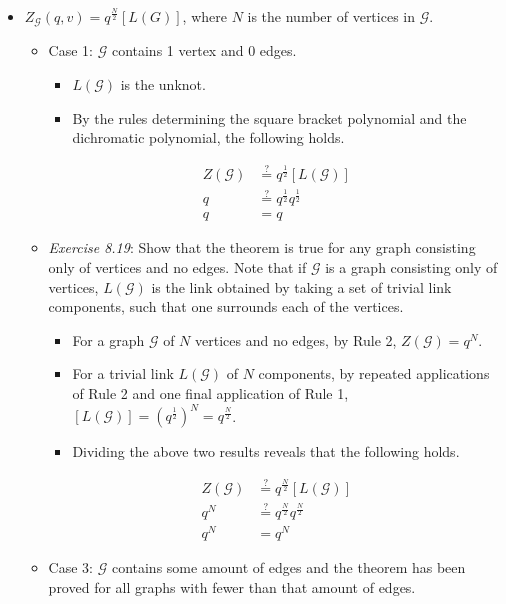 \documentclass[titlepage]{article}
\numberwithin{figure}{section}
\numberwithin{table}{section}
\numberwithin{equation}{section}
\begin{document}
\begin{itemize}
    \item $Z_\mathcal{G}(q,v)=q^\frac{N}{2}[L(G)]$, where $N$ is the number of vertices in $\mathcal{G}$.
    \begin{itemize}
        \item Case 1: $\mathcal{G}$ contains 1 vertex and 0 edges.
        \begin{itemize}
            \item $L(\mathcal{G})$ is the unknot.
            \item By the rules determining the square bracket polynomial and the dichromatic polynomial, the following holds.
        \end{itemize}
        \begin{align*}
            Z(\mathcal{G}) &\stackrel{?}{=} q^\frac{1}{2}[L(\mathcal{G})]\\
            q &\stackrel{?}{=} q^\frac{1}{2}q^\frac{1}{2}\\
            q &= q
        \end{align*}
        \item \emph{Exercise 8.19}: Show that the theorem is true for any graph consisting only of vertices and no edges. Note that if $\mathcal{G}$ is a graph consisting only of vertices, $L(\mathcal{G})$ is the link obtained by taking a set of trivial link components, such that one surrounds each of the vertices.
        \begin{itemize}
            \item For a graph $\mathcal{G}$ of $N$ vertices and no edges, by Rule 2, $Z(\mathcal{G})=q^N$.
            \item For a trivial link $L(\mathcal{G})$ of $N$ components, by repeated applications of Rule 2 and one final application of Rule 1, $[L(\mathcal{G})]=\left( q^\frac{1}{2} \right)^N=q^\frac{N}{2}$.
            \item Dividing the above two results reveals that the following holds.
        \end{itemize}
        \begin{align*}
            Z(\mathcal{G}) &\stackrel{?}{=} q^\frac{N}{2}[L(\mathcal{G})]\\
            q^N &\stackrel{?}{=} q^\frac{N}{2}q^\frac{N}{2}\\
            q^N &= q^N
        \end{align*}
        \item Case 3: $\mathcal{G}$ contains some amount of edges and the theorem has been proved for all graphs with fewer than that amount of edges.

\end{itemize}
\end{itemize}
\end{document}
